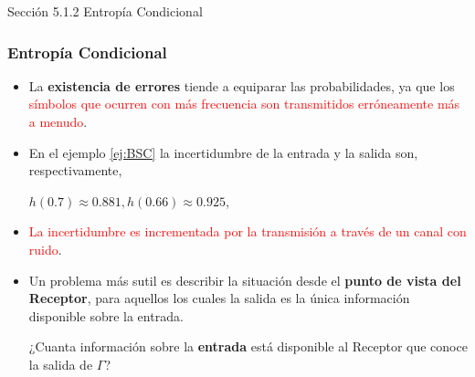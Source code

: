 \documentclass{beamer}
\theoremstyle{plain}
\theoremstyle{example}
\theoremstyle{example}
\begin{document}
\begin{frame}   \footnotesize
{
\begin{block}{Sección 5.1.2}
Entropía Condicional
\end{block}
}
\end{frame} 



\begin{frame}  \frametitle{Entropía Condicional}\small  
\begin{itemize}  

\item La \textbf{existencia de errores} tiende a equiparar las probabilidades, ya que los \textcolor{red}{símbolos que ocurren con más frecuencia son transmitidos erróneamente más a menudo}.

\item   En el ejemplo \ref{ej:BSC} la incertidumbre de la entrada y la salida son, respectivamente,

\begin{center}
$h(0.7) \approx 0.881,	h(0.66) \approx 0.925$,
\end{center}

\item \textcolor{red}{La incertidumbre es incrementada por la transmisión a través de un canal con ruido}. 

\item Un problema más sutil es describir la situación desde el \textbf{punto de vista del Receptor}, para aquellos los cuales la salida es la única información disponible sobre la entrada.

\begin{center}
¿Cuanta información sobre la \textbf{entrada} está disponible al Receptor que conoce la salida de $\Gamma$?
\end{center}
\end{itemize} 
\end{frame}
\end{document}

